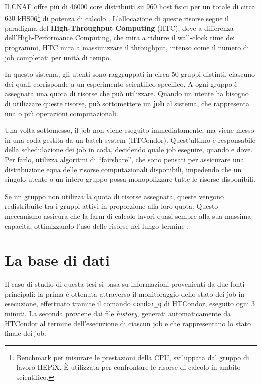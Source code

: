 Il CNAF offre più di 46000 core distribuiti su 960 host fisici per un totale
di circa $630$ kHS06\footnote{Benchmark per misurare le prestazioni della CPU,
sviluppata dal gruppo di lavoro HEPiX. È utilizzata per confrontare le risorse
di calcolo in ambito scientifico.} di potenza di calcolo \cite{hepix2022}.
L'allocazione di queste risorse segue il paradigma del \textbf{High-Throughput
Computing} (HTC), dove a differenza dell'High-Performance Computing, che mira
a ridurre il wall-clock time dei programmi, HTC mira a massimizzare il
throughput, intenso come il numero di job completati per unità di tempo.

In questo sistema, gli utenti sono raggruppati in circa 50 gruppi distinti,
ciascuno dei quali corrisponde a un esperimento scientifico specifico. A ogni
gruppo è assegnata una quota di risorse che può utilizzare. Quando un utente
ha bisogno di utilizzare queste risorse, può sottomettere un \textbf{job} al
sistema, che rappresenta una o più operazioni computazionali.

Una volta sottomesso, il job non viene eseguito immediatamente, ma viene messo
in una coda gestita da un batch system (HTCondor). Quest'ultimo è responsabile
della schedulazione dei job in coda, decidendo quale job eseguire, quando e
dove. Per farlo, utilizza algoritmi di ``fairshare'', che sono pensati per
assicurare una distribuzione equa delle risorse computazionali disponibili,
impedendo che un singolo utente o un intero gruppo possa monopolizzare tutte
le risorse disponibili.

Se un gruppo non utilizza la quota di risorse assegnata, queste vengono
redistribuite tra i gruppi attivi in proporzione alla loro quota. Questo
meccanismo assicura che la farm di calcolo lavori quasi sempre alla sua
massima capacità, ottimizzando l'uso delle risorse nel lungo termine
\cite{cnaf_calcolo}.

\section{La base di dati}

Il caso di studio di questa tesi si basa su informazioni provenienti da due
fonti principali: la prima è ottenuta attraverso il monitoraggio dello stato
dei job in esecuzione, effettuato tramite il comando \texttt{condor\_q} di
HTCondor, eseguito ogni 3 minuti. La seconda proviene dai file
\textit{history}, generati automaticamente da HTCondor al termine
dell'esecuzione di ciascun job e che rappresentano lo stato finale dei job.

